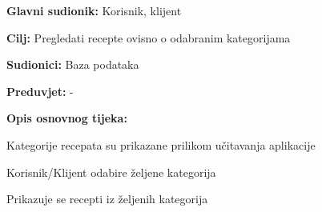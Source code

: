 					\noindent {}
					\begin{packed_item}
	
						\item \textbf{Glavni sudionik: } Korisnik, klijent
						\item  \textbf{Cilj:} Pregledati recepte ovisno o odabranim kategorijama
						\item  \textbf{Sudionici:} Baza podataka
						\item  \textbf{Preduvjet:} -
						\item  \textbf{Opis osnovnog tijeka:}
						
						\item[] \begin{packed_enum}
	
							\item Kategorije recepata su prikazane prilikom učitavanja aplikacije
							\item Korisnik/Klijent odabire željene kategorija 
							\item Prikazuje se recepti iz željenih kategorija
						\end{packed_enum}
					\end{packed_item}

